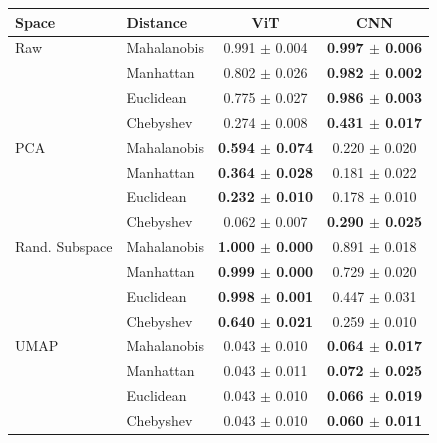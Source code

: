 \begin{tabular}{llcc}
\toprule
Space & Distance & ViT & CNN \\
\midrule
Raw & Mahalanobis & 0.991 $\pm$ 0.004 & \textbf{0.997 $\pm$ 0.006} \\
 & Manhattan & 0.802 $\pm$ 0.026 & \textbf{0.982 $\pm$ 0.002} \\
 & Euclidean & 0.775 $\pm$ 0.027 & \textbf{0.986 $\pm$ 0.003} \\
 & Chebyshev & 0.274 $\pm$ 0.008 & \textbf{0.431 $\pm$ 0.017} \\
\midrule
PCA & Mahalanobis & \textbf{0.594 $\pm$ 0.074} & 0.220 $\pm$ 0.020 \\
 & Manhattan & \textbf{0.364 $\pm$ 0.028} & 0.181 $\pm$ 0.022 \\
 & Euclidean & \textbf{0.232 $\pm$ 0.010} & 0.178 $\pm$ 0.010 \\
 & Chebyshev & 0.062 $\pm$ 0.007 & \textbf{0.290 $\pm$ 0.025} \\
\midrule
Rand. Subspace & Mahalanobis & \textbf{1.000 $\pm$ 0.000} & 0.891 $\pm$ 0.018 \\
 & Manhattan & \textbf{0.999 $\pm$ 0.000} & 0.729 $\pm$ 0.020 \\
 & Euclidean & \textbf{0.998 $\pm$ 0.001} & 0.447 $\pm$ 0.031 \\
 & Chebyshev & \textbf{0.640 $\pm$ 0.021} & 0.259 $\pm$ 0.010 \\
\midrule
UMAP & Mahalanobis & 0.043 $\pm$ 0.010 & \textbf{0.064 $\pm$ 0.017} \\
 & Manhattan & 0.043 $\pm$ 0.011 & \textbf{0.072 $\pm$ 0.025} \\
 & Euclidean & 0.043 $\pm$ 0.010 & \textbf{0.066 $\pm$ 0.019} \\
 & Chebyshev & 0.043 $\pm$ 0.010 & \textbf{0.060 $\pm$ 0.011} \\

\bottomrule
\end{tabular}